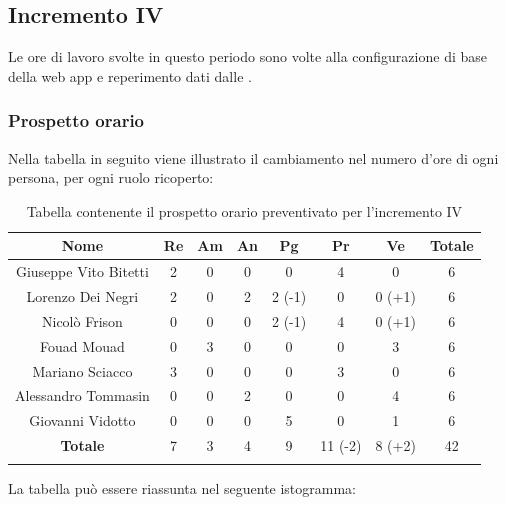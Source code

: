 		
		\subsection{Incremento IV}
		Le ore di lavoro svolte in questo periodo sono volte alla configurazione di base della web app e reperimento dati dalle .
		\subsubsection{Prospetto orario}
			Nella tabella in seguito viene illustrato il cambiamento nel numero d'ore di ogni persona, per ogni ruolo ricoperto:
			
			\begin{longtable}{|c|c|c|c|c|c|c|c}
				\hline
				\rowcolor{lighter-grayer}
				\textbf{Nome} & \textbf{Re} & \textbf{Am} & \textbf{An} & \textbf{Pg}  & \textbf{Pr}   & \textbf{Ve} & \textbf{Totale} \\
				\hline
				\endfirsthead
				\hline
				Giuseppe Vito Bitetti & 2 & 0 & 0 & 0 & 4 & 0 & 6\\
				\hline
				\hline
				Lorenzo Dei Negri & 2 & 0 & 2 & 2 (-1) & 0 & 0 (+1) & 6\\
				\hline
				\hline
				Nicolò Frison & 0 & 0 & 0 & 2 (-1) & 4 & 0 (+1) & 6\\
				\hline
				\hline
				Fouad Mouad & 0 & 3 & 0 & 0 & 0 & 3 & 6\\
				\hline
				\hline
				Mariano Sciacco & 3 & 0 & 0 & 0 & 3 & 0 & 6\\
				\hline
				\hline
				Alessandro Tommasin & 0 & 0 & 2 & 0 & 0 & 4 & 6\\
				\hline
				\hline
				Giovanni Vidotto & 0 & 0 & 0 & 5 & 0 & 1 & 6\\
				\hline 
				\textbf{Totale} & 7 &  3 & 4 & 9 & 11 (-2) & 8 (+2) & 42 \\
				\hline 
				
				\caption{Tabella contenente il prospetto orario preventivato per l'incremento IV}
			\end{longtable}
			\pagebreak	
			
			La tabella può essere riassunta nel seguente istogramma:
			

